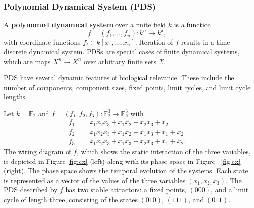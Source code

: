 \documentclass[11pt]{amsart}
\newenvironment{example}[1][Example]{\begin{trivlist}
\item[\hskip \labelsep {\bfseries #1}]}{\end{trivlist}}
\begin{document}
\subsubsection{Polynomial Dynamical System (PDS)}
A {\bf polynomial dynamical system} \cite{JLSS} over a finite field $k$ is a function
$$f = (f_1, \ldots, f_n) : k^n \rightarrow k^n,$$ 
with coordinate functions $f_i \in k[x_1, \ldots , x_n]$. Iteration of $f$ results
in a time-discrete dynamical system. PDSs are special cases of finite
dynamical systems, which are maps $X^n \rightarrow   X^n$ over arbitrary
finite sets $X$.

PDS have several dynamic features of biological
relevance. These include the number of components, component sizes, fixed
points, limit cycles, and limit cycle lengths. 
\begin{example}
Let $k= \mathbb F_2$ and $f = (f_1, f_2, f_3) : \mathbb F_2^3 \rightarrow
\mathbb F_2^3$ with 
\begin{align*}
f_1 &= x_1x_2x_3+x_1x_2+x_2x_3+x_2 \\
f_2 &= x_1x_2x_3+x_1x_2+x_1x_3+x_1+x_2 \\
f_3 &= x_1x_2x_3+x_1x_3+x_2x_3+x_1+x_2.
\end{align*}
The wiring diagram of $f$, which shows the static interaction of the three
variables, is
depicted in Figure \ref{fig:ex} (left) along with its phase space in Figure
~\ref{fig:ex} (right).
The phase space shows the temporal evolution of the systems. Each state is 
represented as a vector of the values of the three variables $(x_1, x_2,
x_3)$. 
The PDS described by $f$ has
two stable attractors: a fixed points, $(000)$, and a limit cycle of length
three, consisting of the states $(010)$, $(111)$, and $(011)$.
\end{example}
\end{document}
